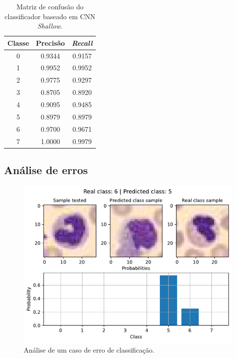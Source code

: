 \begin{table}[H]
	\centering
\begin{tabular}{c|c|c}
	\textbf{Classe} & \textbf{Precisão} & \textit{\textbf{Recall}} \\ \hline
	0               & 0.9344            & 0.9157                   \\
	1               & 0.9952            & 0.9952                   \\
	2               & 0.9775            & 0.9297                   \\
	3               & 0.8705            & 0.8920                   \\
	4               & 0.9095            & 0.9485                   \\
	5               & 0.8979            & 0.8979                   \\
	6               & 0.9700            & 0.9671                   \\
	7               & 1.0000            & 0.9979                  
\end{tabular}
	\caption{Matriz de confusão do classificador baseado em CNN \textit{Shallow}.}
	\label{tab:pr_CNN_deep}
\end{table}

\subsection{Análise de erros}


\begin{figure}[H]
	\centering
	\includegraphics[width=0.75\linewidth]{../../plot/cnn_deep/error_analyser_8}
	\caption{Análise de um caso de erro de classificação.}
	\label{fig:error_analyser_8}
\end{figure}

